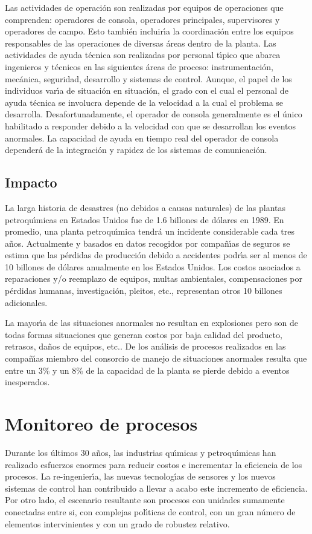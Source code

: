 Las actividades de operaci{\'o}n son realizadas por equipos de operaciones que comprenden: operadores de
consola, operadores principales, supervisores y operadores de campo. Esto tambi{\'e}n incluir{\'\i}a la coordinaci{\'o}n
entre los equipos responsables de las operaciones de diversas {\'a}reas dentro de la planta. Las actividades de
ayuda t{\'e}cnica son realizadas por personal t{\'\i}pico que abarca ingenieros y t{\'e}cnicos en las siguientes {\'a}reas de
proceso: instrumentaci{\'o}n, mec{\'a}nica, seguridad, desarrollo y sistemas de control. Aunque, el papel de los
individuos var{\'\i}a de situaci{\'o}n en situaci{\'o}n, el grado con el cual el personal de ayuda t{\'e}cnica se involucra
depende de la velocidad a la cual el problema se desarrolla. Desafortunadamente, el operador de consola
generalmente es el {\'u}nico habilitado a responder debido a la velocidad con que se desarrollan los eventos
anormales. La capacidad de ayuda en tiempo real del operador de consola depender{\'a} de la integraci{\'o}n y
rapidez de los sistemas de comunicaci{\'o}n.

\subsection{Impacto}
La larga historia de desastres (no debidos a causas naturales) de las plantas petroqu{\'\i}micas en Estados
Unidos fue de 1.6 billones de d{\'o}lares en 1989. En promedio, una planta petroqu{\'\i}mica tendr{\'a} un incidente
considerable cada tres a{\~n}os. Actualmente y basados en datos recogidos por compa{\~n}{\'\i}as de seguros se estima que
las p{\'e}rdidas de producci{\'o}n debido a accidentes podr{\'\i}a ser al menos de 10 billones de d{\'o}lares anualmente en
los Estados Unidos. Los costos asociados a reparaciones y/o reemplazo de equipos, multas ambientales,
compensaciones por p{\'e}rdidas humanas, investigaci{\'o}n, pleitos, etc., representan otros 10 billones
adicionales.

La mayor{\'\i}a de las situaciones anormales no resultan en explosiones pero son de todas formas situaciones que
generan costos por baja calidad del producto, retrasos, da{\~n}os de equipos, etc.. De los an{\'a}lisis de procesos
realizados en las compa{\~n}{\'\i}as miembro del consorcio de manejo de situaciones anormales resulta que entre un
3\% y un 8\% de la capacidad de la planta se pierde debido a eventos inesperados.

\section{Monitoreo de procesos}
Durante los {\'u}ltimos 30 a{\~n}os, las industrias qu{\'\i}micas y petroqu{\'\i}micas han realizado esfuerzos enormes para
reducir costos e incrementar la eficiencia de los procesos. La re-ingenier{\'\i}a, las nuevas tecnolog{\'\i}as de
sensores y los nuevos sistemas de control han contribuido a llevar a acabo este incremento de eficiencia.
Por otro lado, el escenario resultante son procesos con unidades sumamente conectadas entre si, con
complejas pol{\'\i}ticas de control, con un gran n{\'u}mero de elementos intervinientes y con un grado de robustez
relativo.

